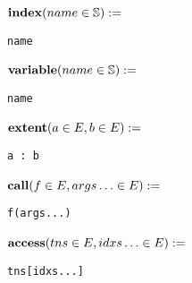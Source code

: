 \noindent\begin{minipage}{\leftwidth}
\raggedleft $\text{\textbf{index}}(name \in \mathbb{S}) :=$~
\end{minipage}%
\begin{minipage}{\rightwidth}
\begin{verbatim}
name
\end{verbatim}
\end{minipage}

\noindent\begin{minipage}{\leftwidth}
\raggedleft $\text{\textbf{variable}}(name \in \mathbb{S}) :=$~
\end{minipage}%
\begin{minipage}{\rightwidth}
\begin{verbatim}
name
\end{verbatim}
\end{minipage}

\noindent\begin{minipage}{\leftwidth}
\raggedleft $\text{\textbf{extent}}(a \in E, b \in E) :=$~
\end{minipage}%
\begin{minipage}{\rightwidth}
\begin{verbatim}
a : b
\end{verbatim}
\end{minipage}

\noindent\begin{minipage}{\leftwidth}
\raggedleft $\text{\textbf{call}}(f \in E, args\ldots \in E) :=$~
\end{minipage}%
\begin{minipage}{\rightwidth}
\begin{verbatim}
f(args...)
\end{verbatim}
\end{minipage}

\noindent\begin{minipage}{\leftwidth}
\raggedleft $\text{\textbf{access}}(tns \in E, idxs\ldots \in E) :=$~
\end{minipage}%
\begin{minipage}{\rightwidth}
\begin{verbatim}
tns[idxs...]
\end{verbatim}
\end{minipage}

